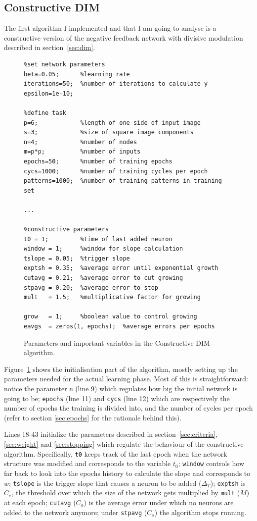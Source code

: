 \documentclass[11pt,a4paper]{report}
\begin{document}
			\subsection{Constructive DIM}
				The first algorithm I implemented and that I am going to analyse is a constructive version of the negative feedback network with divisive modulation described in section~\ref{sec:dim}.
			
				\begin{figure}[h]
					\caption{Parameters and important variables in the Constructive DIM algorithm.}
					\label{lst:params_cdim}
					\centering
\begin{lstlisting}
%set network parameters
beta=0.05;      %learning rate
iterations=50;  %number of iterations to calculate y
epsilon=1e-10;

%define task
p=6;            %length of one side of input image
s=3;            %size of square image components
n=4;            %number of nodes
m=p*p;          %number of inputs
epochs=50;      %number of training epochs
cycs=1000;      %number of training cycles per epoch
patterns=1000;  %number of training patterns in training set

...

%constructive parameters
t0 = 1;         %time of last added neuron
window = 1;     %window for slope calculation
tslope = 0.05;  %trigger slope
exptsh = 0.35;  %average error until exponential growth
cutavg = 0.21;  %average error to cut growing
stpavg = 0.20;  %average error to stop
mult   = 1.5;   %multiplicative factor for growing

grow   = 1;     %boolean value to control growing
eavgs  = zeros(1, epochs);  %average errors per epochs
\end{lstlisting}
				\end{figure}
				
				Figure~\ref{lst:params_cdim} shows the initialisation part of the algorithm, mostly setting up the parameters needed for the actual learning phase. Most of this is straightforward: notice the parameter \texttt{n} (line 9) which regulates how big the initial network is going to be; \texttt{epochs} (line 11) and \texttt{cycs} (line 12) which are respectively the number of epochs the training is divided into, and the number of cycles per epoch (refer to section \ref{sec:epochs} for the rationale behind this).
				
				Lines 18-43 initialize the parameters described in section~\ref{sec:criteria}, \ref{sec:weight} and \ref{sec:stopping} which regulate the behaviour of the constructive algorithm. Specifically, \texttt{t0} keeps track of the last epoch when the network structure was modified and corresponds to the variable $t_0$; \texttt{window} controls how far back to look into the epochs history to calculate the slope and corresponds to $w$; \texttt{tslope} is the trigger slope that causes a neuron to be added ($\Delta_T$); \texttt{exptsh} is $C_e$, the threshold over which the size of the network gets multiplied by \texttt{mult} ($M$) at each epoch; \texttt{cutavg} ($C_a$) is the average error under which no neurons are added to the network anymore; under \texttt{stpavg} ($C_s$) the algorithm stops running.
				
\end{document}
